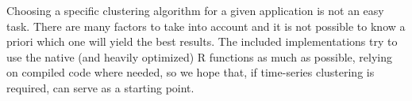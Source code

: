 Choosing a specific clustering algorithm for a given application is not an easy task.
There are many factors to take into account and it is not possible to know a priori which one will yield the best results.
The included implementations try to use the native (and heavily optimized) R functions as much as possible,
relying on compiled code where needed,
so we hope that,
if time-series clustering is required,
\dtwclust{} can serve as a starting point.




\address{%
Alexis Sard\'a-Espinosa\\
\\
Disclaimer: The software package was developed\\
independently of any organization or institution\\
that is or has been associated with the author.
}
